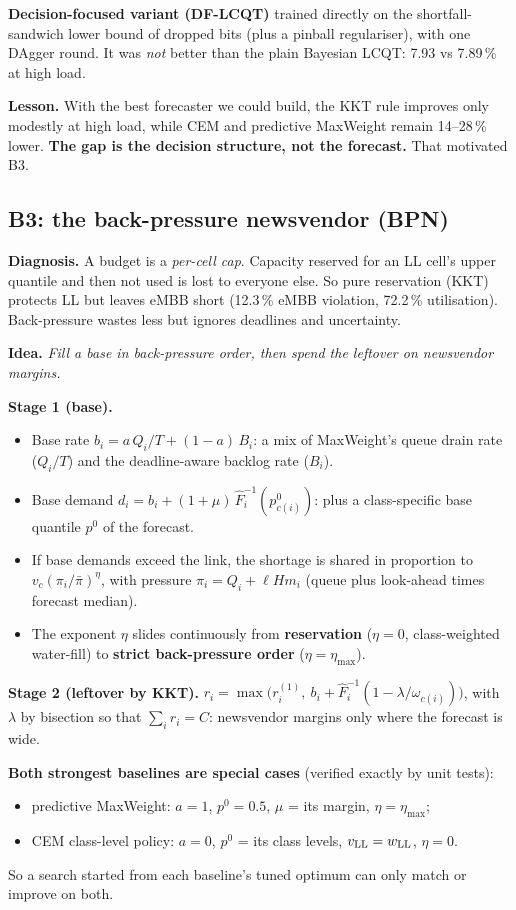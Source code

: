 \documentclass[11pt,a4paper]{article}
\begin{document}
\textbf{Decision-focused variant (DF-LCQT)} trained directly on the shortfall-sandwich lower bound of dropped bits (plus a pinball regulariser), with one DAgger round. It was \emph{not} better than the plain Bayesian LCQT: 7.93 vs 7.89\,\% at high load.

\textbf{Lesson.} With the best forecaster we could build, the KKT rule improves only modestly at high load, while CEM and predictive MaxWeight remain 14--28\,\% lower. \textbf{The gap is the decision structure, not the forecast.} That motivated B3.

\subsection{B3: the back-pressure newsvendor (BPN)}

\textbf{Diagnosis.} A budget is a \emph{per-cell cap}. Capacity reserved for an LL cell's upper quantile and then not used is lost to everyone else. So pure reservation (KKT) protects LL but leaves eMBB short (12.3\,\% eMBB violation, 72.2\,\% utilisation). Back-pressure wastes less but ignores deadlines and uncertainty.

\textbf{Idea.} \emph{Fill a base in back-pressure order, then spend the leftover on newsvendor margins.}

\textbf{Stage 1 (base).}
\begin{itemize}
  \item Base rate $b_i = a\,Q_i/T + (1-a)\,B_i$: a mix of MaxWeight's queue drain rate ($Q_i/T$) and the deadline-aware backlog rate ($B_i$).
  \item Base demand $d_i = b_i + (1+\mu)\,\hat F_i^{-1}(p^0_{c(i)})$: plus a class-specific base quantile $p^0$ of the forecast.
  \item If base demands exceed the link, the shortage is shared in proportion to $v_c(\pi_i/\bar\pi)^{\eta}$, with pressure $\pi_i = Q_i + \ell H m_i$ (queue plus look-ahead times forecast median).
  \item The exponent $\eta$ slides continuously from \textbf{reservation} ($\eta = 0$, class-weighted water-fill) to \textbf{strict back-pressure order} ($\eta = \eta_{\max}$).
\end{itemize}
\textbf{Stage 2 (leftover by KKT).} $r_i = \max\big(r_i^{(1)},\ b_i + \hat F_i^{-1}(1 - \lambda/\omega_{c(i)})\big)$, with $\lambda$ by bisection so that $\sum_i r_i = C$: newsvendor margins only where the forecast is wide.

\textbf{Both strongest baselines are special cases} (verified exactly by unit tests):
\begin{itemize}
  \item predictive MaxWeight: $a = 1$, $p^0 = 0.5$, $\mu$ = its margin, $\eta = \eta_{\max}$;
  \item CEM class-level policy: $a = 0$, $p^0$ = its class levels, $v_{\rm LL} = w_{\rm LL}$, $\eta = 0$.
\end{itemize}
So a search started from each baseline's tuned optimum can only match or improve on both.
\end{document}
